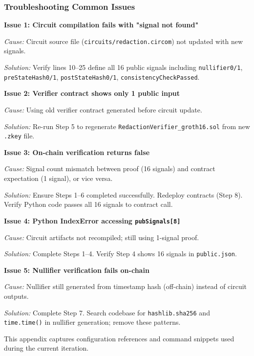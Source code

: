 \subsubsection{Troubleshooting Common Issues}

\textbf{Issue 1: Circuit compilation fails with "signal not found"}

\textit{Cause:} Circuit source file (\texttt{circuits/redaction.circom}) not updated with new signals.

\textit{Solution:} Verify lines 10--25 define all 16 public signals including \texttt{nullifier0/1}, \texttt{preStateHash0/1}, \texttt{postStateHash0/1}, \texttt{consistencyCheckPassed}.

\textbf{Issue 2: Verifier contract shows only 1 public input}

\textit{Cause:} Using old verifier contract generated before circuit update.

\textit{Solution:} Re-run Step 5 to regenerate \texttt{RedactionVerifier\_groth16.sol} from new \texttt{.zkey} file.

\textbf{Issue 3: On-chain verification returns false}

\textit{Cause:} Signal count mismatch between proof (16 signals) and contract expectation (1 signal), or vice versa.

\textit{Solution:} Ensure Steps 1--6 completed successfully. Redeploy contracts (Step 8). Verify Python code passes all 16 signals to contract call.

\textbf{Issue 4: Python IndexError accessing \texttt{pubSignals[8]}}

\textit{Cause:} Circuit artifacts not recompiled; still using 1-signal proof.

\textit{Solution:} Complete Steps 1--4. Verify Step 4 shows 16 signals in \texttt{public.json}.

\textbf{Issue 5: Nullifier verification fails on-chain}

\textit{Cause:} Nullifier still generated from timestamp hash (off-chain) instead of circuit outputs.

\textit{Solution:} Complete Step 7. Search codebase for \texttt{hashlib.sha256} and \texttt{time.time()} in nullifier generation; remove these patterns.

This appendix captures configuration references and command snippets used during the current iteration.


